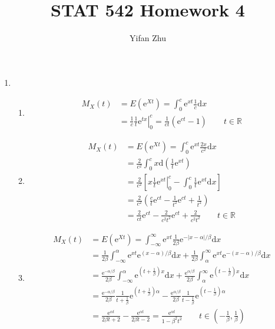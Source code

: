 \documentclass{article}
\begin{document}
	

	
	\title{STAT 542 Homework 4}
	\author{Yifan Zhu}
	\maketitle
	
	\begin{enumerate}[leftmargin = 0 em, label = \arabic*., font = \bfseries]
	\item \begin{enumerate}
		\item 
		\begin{align*}
		M_{X}(t) &= E(\mathrm{e}^{Xt}) = \int_{0}^c \mathrm{e}^{xt} \frac{1}{c} \mathrm{d}x\\
		&=\left.\frac{1}{c} \frac{1}{t} \mathrm{e}^{tx}\right|_{0}^c = \frac{1}{ct} (\mathrm{e}^{ct} - 1)\qquad t\in \mathbb{R}
		\end{align*}


	\item
	\begin{align*}
	M_{X}(t) & = E(\mathrm{e}^{Xt}) = \int_{0}^c \mathrm{e}^{xt} \frac{2 x}{c^2} \mathrm{d}x\\
	&= \frac{2}{c^2} \int_0^{c} x \mathrm{d}\left( \frac{1}{t} \mathrm{e}^{xt}\right)\\
	&= \frac{2}{c^2}\left[\left. x \frac{1}{t} \mathrm{e}^{xt}\right|_0^{c} - \int_{0}^c \frac{1}{t}\mathrm{e}^{xt}\mathrm{d}x\right]\\
	&= \frac{2}{c^2}\left( \frac{c}{t} \mathrm{e}^{ct} - \frac{1}{t^2} \mathrm{e}^{ct} + \frac{1}{t^2}\right)\\
	&= \frac{2}{ct}\mathrm{e}^{ct} - \frac{2}{c^2 t^2} \mathrm{e}^{ct} + \frac{2}{c^2 t^2}\qquad t\in \mathbb{R}
	\end{align*}
	
	\item
	\begin{align*}
	M_X (t) &= E(\mathrm{e}^{Xt}) = \int_{-\infty}^{\infty} \mathrm{e}^{xt} \frac{1}{2 \beta} \mathrm{e}^{-|x - \alpha|/\beta} \mathrm{d}x\\
	&= \frac{1}{2 \beta} \int_{-\infty}^\alpha \mathrm{e}^{xt} \mathrm{e}^{(x - \alpha)/ \beta} \mathrm{d}x + \frac{1}{2 \beta } \int_{\alpha}^\infty \mathrm{e}^{xt} \mathrm{e}^{-(x -\alpha)/\beta}\mathrm{d}x\\
	 &= \frac{\mathrm{e}^{- \alpha / \beta}}{2 \beta} \int_{-\infty}^\alpha \mathrm{e}^{(t+ \frac{1}{\beta})x}\mathrm{d}x + \frac{\mathrm{e}^{\alpha / \beta}}{2 \beta}\int_\alpha^\infty \mathrm{e}^{(t - \frac{1}{\beta})x}\mathrm{d}x\\
	 &= \frac{\mathrm{e}^{-\alpha / \beta}}{2 \beta} \frac{1}{t + \frac{1}{\beta}} \mathrm{e}^{(t + \frac{1}{\beta})\alpha} - \frac{\mathrm{e}^{\alpha / \beta}}{2 \beta} \frac{1}{t - \frac{1}{\beta}} \mathrm{e}^{(t - \frac{1}{\beta})\alpha}\\
	 &= \frac{\mathrm{e}^{\alpha t}}{2 \beta t +2} - \frac{\mathrm{e}^{\alpha t}}{2 \beta t -2} = \frac{\mathrm{e}^{\alpha t}}{1 - \beta^2 t^2}\qquad t\in (- \frac{1}{\beta}, \frac{1}{\beta})
	\end{align*}
	

\end{enumerate}
\end{enumerate}
\end{document}

